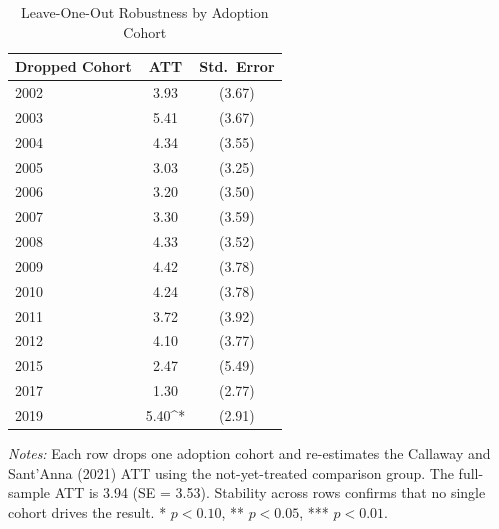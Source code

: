 \begin{table}[H]
\centering
\caption{Leave-One-Out Robustness by Adoption Cohort}
\label{tab:loo}
\begin{threeparttable}
\begin{tabular}{lcc}
\toprule
Dropped Cohort & ATT & Std.\ Error \\
\midrule
2002 & 3.93 & (3.67) \\
2003 & 5.41 & (3.67) \\
2004 & 4.34 & (3.55) \\
2005 & 3.03 & (3.25) \\
2006 & 3.20 & (3.50) \\
2007 & 3.30 & (3.59) \\
2008 & 4.33 & (3.52) \\
2009 & 4.42 & (3.78) \\
2010 & 4.24 & (3.78) \\
2011 & 3.72 & (3.92) \\
2012 & 4.10 & (3.77) \\
2015 & 2.47 & (5.49) \\
2017 & 1.30 & (2.77) \\
2019 & 5.40^{*} & (2.91) \\
\bottomrule
\end{tabular}
\begin{tablenotes}[flushleft]
\small
\item \textit{Notes:} Each row drops one adoption cohort and re-estimates the Callaway and Sant'Anna (2021) ATT using the not-yet-treated comparison group. The full-sample ATT is 3.94 (SE = 3.53). Stability across rows confirms that no single cohort drives the result. * $p<0.10$, ** $p<0.05$, *** $p<0.01$.
\end{tablenotes}
\end{threeparttable}
\end{table}
